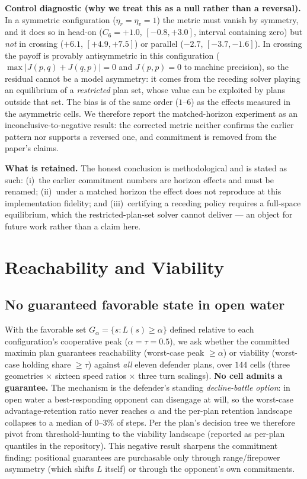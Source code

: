 \documentclass[12pt,a4paper]{article}
\newcommand{\etav}{\eta_v}
\newcommand{\etar}{\eta_r}
\begin{document}
\noindent\textbf{Control diagnostic (why we treat this as a null rather than a
reversal).}  In a symmetric configuration ($\etar=\etav=1$) the metric must
vanish by symmetry, and it does so in head-on
($C_6=+1.0$, $[-0.8,+3.0]$, interval containing zero) but \emph{not} in
crossing ($+6.1$, $[+4.9,+7.5]$) or parallel ($-2.7$, $[-3.7,-1.6]$).  In
crossing the payoff is provably antisymmetric in this configuration
($\max|J(p,q)+J(q,p)|=0$ and $J(p,p)=0$ to machine precision), so the
residual cannot be a model asymmetry: it comes from the receding solver
playing an equilibrium of a \emph{restricted} plan set, whose value can be
exploited by plans outside that set.  The bias is of the same order
($1$--$6$) as the effects measured in the asymmetric cells.  We therefore
report the matched-horizon experiment as an inconclusive-to-negative result:
the corrected metric neither confirms the earlier pattern nor supports a
reversed one, and commitment is removed from the paper's claims.

\noindent\textbf{What is retained.}  The honest conclusion is methodological
and is stated as such: (i)~the earlier commitment numbers are horizon
effects and must be renamed; (ii)~under a matched horizon the effect does not
reproduce at this implementation fidelity; and (iii)~certifying a receding
policy requires a full-space equilibrium, which the restricted-plan-set
solver cannot deliver --- an object for future work rather than a claim here.

\section{Reachability and Viability}\label{sec:reachability}

\subsection{No guaranteed favorable state in open water}
With the favorable set $G_\alpha=\{s: L(s)\ge\alpha\}$ defined relative to
each configuration's cooperative peak ($\alpha=\tau=0.5$), we ask whether
the committed maximin plan guarantees reachability (worst-case peak
$\ge\alpha$) or viability (worst-case holding share $\ge\tau$) against
\emph{all} eleven defender plans, over $144$ cells (three geometries
$\times$ sixteen speed ratios $\times$ three turn scalings).
\textbf{No cell admits a guarantee.}  The mechanism is the defender's
standing \emph{decline-battle option}: in open water a best-responding opponent
can disengage at will, so the worst-case advantage-retention ratio never
reaches $\alpha$ and the per-plan retention landscape collapses to a
median of $0$--$3\%$ of steps.  Per the plan's decision tree we therefore
pivot from threshold-hunting to the viability landscape (reported as
per-plan quantiles in the repository).  This negative result sharpens the
commitment finding: positional guarantees are purchasable only through
range/firepower asymmetry (which shifts $L$ itself) or through the
opponent's own commitments.
\end{document}
